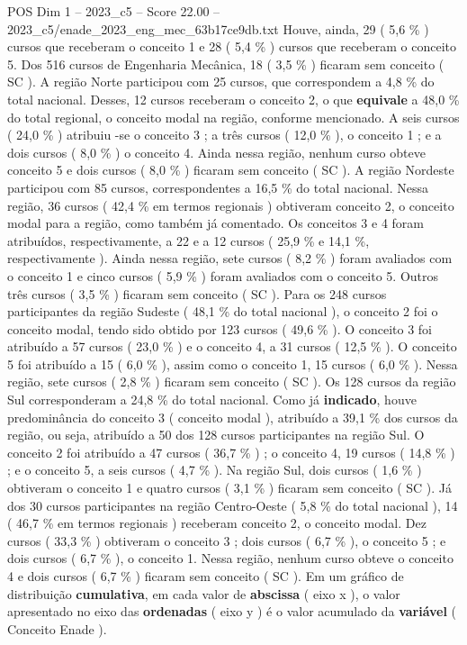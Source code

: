 \begin{textsample}{POS Dim 1 – 2023\_c5 – Score 22.00 – 2023\_c5/enade\_2023\_eng\_mec\_63b17ce9db.txt}
Houve, ainda, 29 ( 5,6 \% ) cursos que receberam o conceito 1 e 28 ( 5,4 \% ) cursos que receberam o conceito 5.
Dos 516 cursos de Engenharia Mecânica, 18 ( 3,5 \% ) ficaram sem conceito ( SC ).
A região Norte participou com 25 cursos, que correspondem a 4,8 \% do total nacional.
Desses, 12 cursos receberam o conceito 2, o que \textbf{equivale} a 48,0 \% do total regional, o conceito modal na região, conforme mencionado.
A seis cursos ( 24,0 \% ) atribuiu -se o conceito 3 ; a três cursos ( 12,0 \% ), o conceito 1 ; e a dois cursos ( 8,0 \% ) o conceito 4.
Ainda nessa região, nenhum curso obteve conceito 5 e dois cursos ( 8,0 \% ) ficaram sem conceito ( SC ).
A região Nordeste participou com 85 cursos, correspondentes a 16,5 \% do total nacional.
Nessa região, 36 cursos ( 42,4 \% em termos regionais ) obtiveram conceito 2, o conceito modal para a região, como também já comentado.
Os conceitos 3 e 4 foram atribuídos, respectivamente, a 22 e a 12 cursos ( 25,9 \% e 14,1 \%, respectivamente ).
Ainda nessa região, sete cursos ( 8,2 \% ) foram avaliados com o conceito 1 e cinco cursos ( 5,9 \% ) foram avaliados com o conceito 5.
Outros três cursos ( 3,5 \% ) ficaram sem conceito ( SC ).
Para os 248 cursos participantes da região Sudeste ( 48,1 \% do total nacional ), o conceito 2 foi o conceito modal, tendo sido obtido por 123 cursos ( 49,6 \% ).
O conceito 3 foi atribuído a 57 cursos ( 23,0 \% ) e o conceito 4, a 31 cursos ( 12,5 \% ).
O conceito 5 foi atribuído a 15 ( 6,0 \% ), assim como o conceito 1, 15 cursos ( 6,0 \% ).
Nessa região, sete cursos ( 2,8 \% ) ficaram sem conceito ( SC ).
Os 128 cursos da região Sul corresponderam a 24,8 \% do total nacional.
Como já \textbf{indicado}, houve predominância do conceito 3 ( conceito modal ), atribuído a 39,1 \% dos cursos da região, ou seja, atribuído a 50 dos 128 cursos participantes na região Sul.
O conceito 2 foi atribuído a 47 cursos ( 36,7 \% ) ; o conceito 4, 19 cursos ( 14,8 \% ) ; e o conceito 5, a seis cursos ( 4,7 \% ).
Na região Sul, dois cursos ( 1,6 \% ) obtiveram o conceito 1 e quatro cursos ( 3,1 \% ) ficaram sem conceito ( SC ).
Já dos 30 cursos participantes na região Centro-Oeste ( 5,8 \% do total nacional ), 14 ( 46,7 \% em termos regionais ) receberam conceito 2, o conceito modal.
Dez cursos ( 33,3 \% ) obtiveram o conceito 3 ; dois cursos ( 6,7 \% ), o conceito 5 ; e dois cursos ( 6,7 \% ), o conceito 1.
Nessa região, nenhum curso obteve o conceito 4 e dois cursos ( 6,7 \% ) ficaram sem conceito ( SC ).
Em um gráfico de distribuição \textbf{cumulativa}, em cada valor de \textbf{abscissa} ( eixo x ), o valor apresentado no eixo das \textbf{ordenadas} ( eixo y ) é o valor acumulado da \textbf{variável} ( Conceito Enade ).

\end{textsample}
